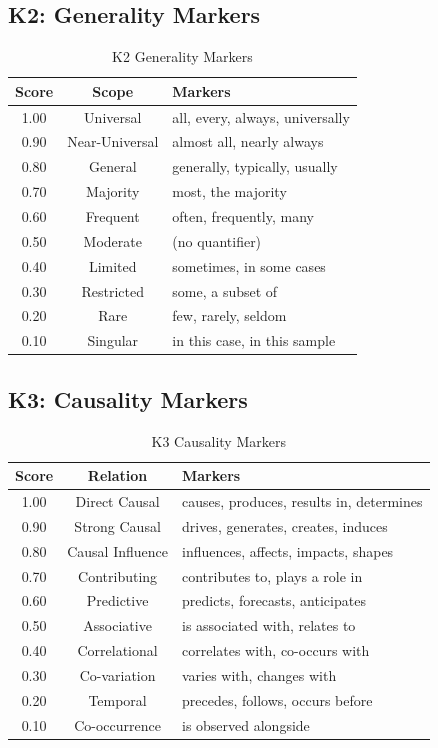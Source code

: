 \subsection{K2: Generality Markers}

\begin{table}[H]
\centering
\small
\begin{tabular}{ccl}
\toprule
\textbf{Score} & \textbf{Scope} & \textbf{Markers} \\
\midrule
1.00 & Universal & all, every, always, universally \\
0.90 & Near-Universal & almost all, nearly always \\
0.80 & General & generally, typically, usually \\
0.70 & Majority & most, the majority \\
0.60 & Frequent & often, frequently, many \\
0.50 & Moderate & (no quantifier) \\
0.40 & Limited & sometimes, in some cases \\
0.30 & Restricted & some, a subset of \\
0.20 & Rare & few, rarely, seldom \\
0.10 & Singular & in this case, in this sample \\
\bottomrule
\end{tabular}
\caption{K2 Generality Markers}
\end{table}


\subsection{K3: Causality Markers}

\begin{table}[H]
\centering
\small
\begin{tabular}{ccl}
\toprule
\textbf{Score} & \textbf{Relation} & \textbf{Markers} \\
\midrule
1.00 & Direct Causal & causes, produces, results in, determines \\
0.90 & Strong Causal & drives, generates, creates, induces \\
0.80 & Causal Influence & influences, affects, impacts, shapes \\
0.70 & Contributing & contributes to, plays a role in \\
0.60 & Predictive & predicts, forecasts, anticipates \\
0.50 & Associative & is associated with, relates to \\
0.40 & Correlational & correlates with, co-occurs with \\
0.30 & Co-variation & varies with, changes with \\
0.20 & Temporal & precedes, follows, occurs before \\
0.10 & Co-occurrence & is observed alongside \\
\bottomrule
\end{tabular}
\caption{K3 Causality Markers}
\end{table}


